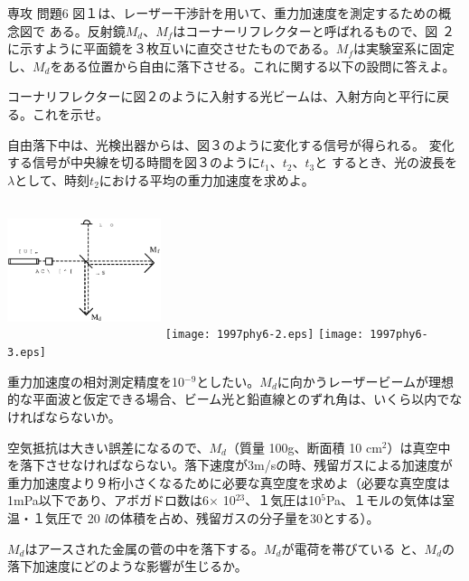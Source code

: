 \documentclass[fleqn]{jbook}
\begin{document}
\begin{question}{専攻 問題6}{}
図１は、レーザー干渉計を用いて、重力加速度を測定するための概念図で
ある。反射鏡$M_d$、$M_f$はコーナーリフレクターと呼ばれるもので、図
２に示すように平面鏡を３枚互いに直交させたものである。$M_f$は実験室系に固定し、$M_d$をある位置から自由に落下させる。これに関する以下の設問に答えよ。

\begin{subquestions}
\SubQuestion
コーナリフレクターに図２のように入射する光ビームは、入射方向と平行に戻る。これを示せ。

\SubQuestion
自由落下中は、光検出器からは、図３のように変化する信号が得られる。
変化する信号が中央線を切る時間を図３のように$t_1$、$t_2$、$t_3$と
するとき、光の波長を$\lambda$として、時刻$t_2$における平均の重力加速度を求めよ。

\begin{center}
\includegraphics[clip,height=40mm,width=45mm]{1997phy6-1.eps}
\texttt{[image: 1997phy6-2.eps]}
\texttt{[image: 1997phy6-3.eps]}
\end{center}

\SubQuestion
重力加速度の相対測定精度を10$^{-9}$としたい。$M_d$に向かうレーザービームが理想的な平面波と仮定できる場合、ビーム光と鉛直線とのずれ角は、いくら以内でなければならないか。

\SubQuestion
空気抵抗は大きい誤差になるので、$M_d$（質量 100g、断面積 10 cm$^2$）は真空中を落下させなければならない。落下速度が3m/sの時、残留ガスによる加速度が重力加速度より９桁小さくなるために必要な真空度を求めよ（必要な真空度は1mPa以下であり、アボガドロ数は6$\times$ 10$^{23}$、１気圧は10$^5$Pa、１モルの気体は室温・１気圧で 20 {\it{l}}の体積を占め、残留ガスの分子量を30とする）。

\SubQuestion
$M_d$はアースされた金属の菅の中を落下する。$M_d$が電荷を帯びている
と、$M_d$の落下加速度にどのような影響が生じるか。

\end{subquestions}
\end{question}
\end{document}
